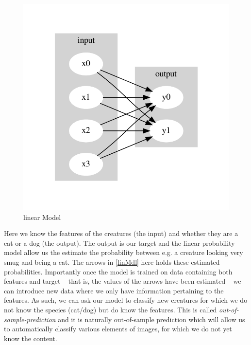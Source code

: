 \documentclass[a4paper]{article}
\begin{document}
\begin{figure}[!htb]
	\centering
	\caption{linear Model}\label{linMdl}
	\includegraphics[scale=0.55]{linMdl.pdf}
\end{figure}

Here we know the features of the creatures (the input) and whether they are a cat or a dog (the output). The output is our target and the linear probability model allow us the estimate the probability between e.g. a creature looking very smug and being a cat. The arrows in \autoref{linMdl} here holds these estimated probabilities. Importantly once the model is trained on data containing both features and target -- that is, the values of the arrows have been estimated --  we can introduce new data where we only have information pertaining to the features. As such, we can ask our model to classify new creatures for which we do not know the species (cat/dog) but do know the features. This is called \emph{out-of-sample-prediction} and it is naturally out-of-sample prediction which will allow us to automatically classify various elements of images, for which we do not yet know the content.\par
\end{document}
